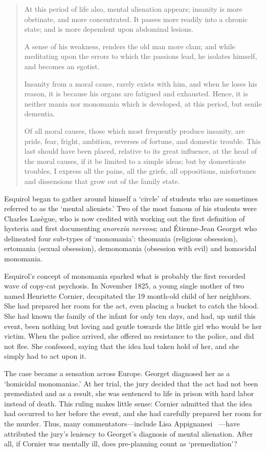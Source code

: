 \begin{refsection}
\begin{quote}
At this period of life also, mental alienation appears; insanity is more obstinate, and more concentrated. It passes more readily into a chronic state; and is more dependent upon abdominal lesions.

A sense of his weakness, renders the old man more clam; and while meditating upon the errors to which the passions lead, he isolates himself, and becomes an egotist.

Insanity from a moral cause, rarely exists with him, and when he loses his reason, it is because his organs are fatigued and exhausted. Hence, it is neither mania nor monomania which is developed, at this period, but senile dementia.

Of all moral causes, those which most frequently produce insanity, are pride, fear, fright, ambition, reverses of fortune, and domestic trouble. This last should have been placed, relative to its great influence, at the head of the moral causes, if it be limited to a simple ideas; but by domesticate troubles, I express all the pains, all the griefs, all oppositions, misfortunes and dissensions that grow out of the family state.
~\citep[P. 45--46]{Esquirol:1845ug}
\end{quote}

Esquirol began to gather around himself a `circle' of students who are sometimes referred to as the `mental alienists.' Two of the most famous of his students were Charles Lasègue, who is now credited with working out the first definition of hysteria and first documenting \emph{anorexia nervosa}; and Étienne-Jean Georget who delineated four sub-types of `monomania': theomania (religious obsession), ertomania (sexual obsession), demonomania (obsession with evil) and homocidal monomania.

Esquirol's concept of monomania sparked what is probably the first recorded wave of copy-cat psychosis. In November 1825, a young single mother of two named Henriette Cornier, decapitated the 19 month-old child of her neighbors. She had prepared her room for the act, even placing a bucket to catch the blood. She had known the family of the infant for only ten days, and had, up until this event, been nothing but loving and gentle towards the little girl who would be her victim. When the police arrived, she offered no resistance to the police, and did not flee. She confessed, saying that the idea had taken hold of her, and she simply had to act upon it.

The case became a sensation across Europe. Georget diagnosed her as a `homicidal monomaniac.' At her trial, the jury decided that the act had not been premediated and as a result, she was sentenced to life in prison with hard labor instead of death. This ruling makes little sense: Cornier admitted that the idea had occurred to her before the event, and she had carefully prepared her room for the murder. Thus, many commentators---include Lisa Appignanesi ~\citep[p 75]{Appignanesi:2009vl}---have attributed the jury's leniency to Georget's diagnosis of mental alienation. After all, if Cornier was mentally ill, does pre-planning count as `premediation'?


\end{refsection}
